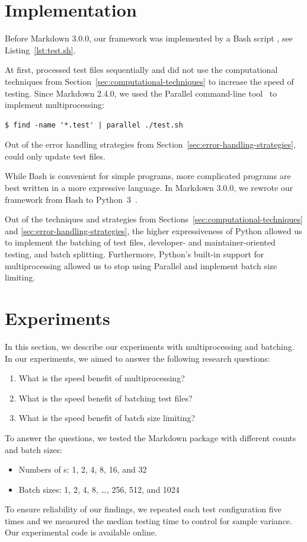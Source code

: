 \documentclass[final]{ltugboat}
\begin{document}
\section{Implementation}
\label{sec:implementation}

Before Markdown 3.0.0, our framework was implemented by a Bash script , see Listing~\ref{lst:test.sh}.

At first,  processed test files sequentially and did not use the computational techniques from Section~\ref{sec:computational-techniques} to increase the speed of testing. Since Markdown 2.4.0, we used the  Parallel command-line tool~\cite{tange2011gnu} to implement multiprocessing:
\begin{verbatim}
$ find -name '*.test' | parallel ./test.sh
\end{verbatim}
Out of the error handling strategies from Section~\ref{sec:error-handling-strategies},  could only update test files.

While Bash is convenient for simple programs, more complicated programs are best written in a more expressive language. In Markdown 3.0.0, we rewrote our framework from Bash to Python~3~\cite{novotny2023implement}.

Out of the techniques and strategies from Sections~\ref{sec:computational-techniques} and \ref{sec:error-handling-strategies}, the higher expressiveness of Python allowed us to implement the batching of test files, developer- and maintainer-oriented testing, and batch splitting. Furthermore, Python's built-in support for multiprocessing allowed us to stop using  Parallel and implement batch size limiting.

\section{Experiments}
\label{sec:experiments}

In this section, we describe our experiments with multiprocessing and batching. In our experiments, we aimed to answer the following research questions:
\begin{enumerate}
\item What is the speed benefit of multiprocessing?
\item What is the speed benefit of batching test files?
\item What is the speed benefit of batch size limiting?
\end{enumerate}
To answer the questions, we tested the Markdown package with different  counts and batch sizes:
\begin{itemize}
\item Numbers of s: 1, 2, 4, 8, 16, and 32
\item Batch sizes: 1, 2, 4, 8, \ldots, 256, 512, and 1024
\end{itemize}
To ensure reliability of our findings, we repeated each test configuration five times and we measured the median testing time to control for sample variance. Our experimental code is available online.~\cite{starynovotny2023measure}
\end{document}
